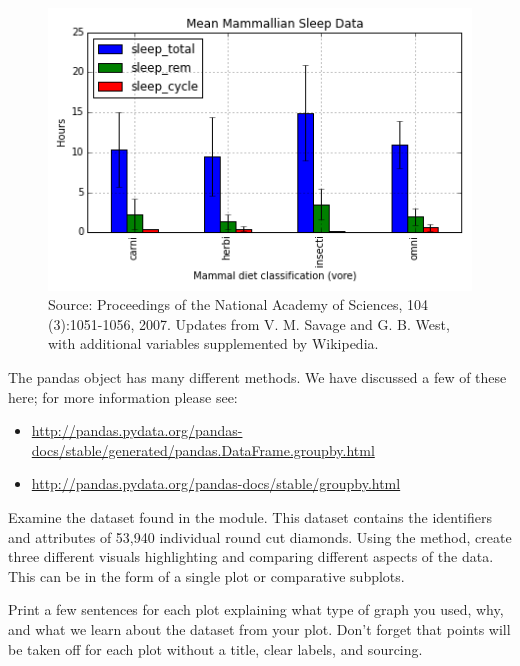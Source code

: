 \begin{figure}[H] 
    \centering
    \includegraphics[width=.75\textwidth]{MeanMammal.png}
    \caption{Source:  Proceedings of the National Academy of Sciences, 104 (3):1051-1056, 2007. Updates from V. M. Savage and G. B. West, with additional variables supplemented by Wikipedia.}
    \label{fig:aplot}
\end{figure}

The pandas  object has many different methods.
We have discussed a few of these here; for more information please see: 
\begin{itemize}
    \item \url{http://pandas.pydata.org/pandas-docs/stable/generated/pandas.DataFrame.groupby.html}
    \item \url{http://pandas.pydata.org/pandas-docs/stable/groupby.html}
\end{itemize}

\begin{problem} 
Examine the  dataset found in the  module. 
This dataset contains the identifiers and attributes of 53,940  individual round cut diamonds. 
Using the  method, create three different visuals highlighting and comparing different aspects of the data.
This can be in the form of a single plot or comparative subplots.

Print a few sentences for each plot explaining what type of graph you used, why, and what we learn about the dataset from your plot.
Don't forget that points will be taken off for each plot without a title, clear labels, and sourcing. 
\end{problem}

